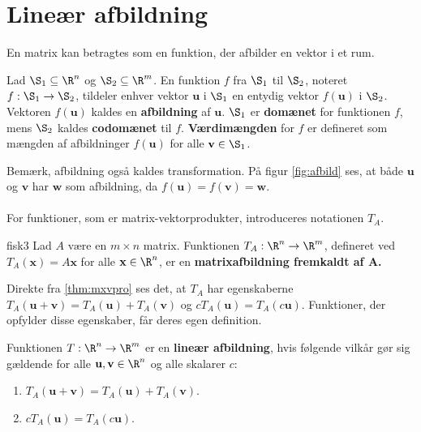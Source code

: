 \section{Lineær afbildning}
%
En matrix kan betragtes som en funktion, der afbilder en vektor i et rum.
%
\begin{defn}{}{}
Lad $\S _1 \subseteq \R^n$ og $\S _2 \subseteq \R^m$.
En funktion $f$ fra $\S_1$ til $\S_2$, noteret $f:\S_1\rightarrow\S_2$, tildeler enhver vektor $\textbf{u}$ i $\S_1$ en entydig vektor $f(\textbf{u})$ i $\S_2$.
Vektoren $f(\textbf{u})$ kaldes en \textbf{afbildning} af $\textbf{u}$.
$\S_1$ er \textbf{domænet} for funktionen $f$, mens $\S_2$ kaldes \textbf{codomænet} til $f$.
\textbf{Værdimængden} for $f$ er defineret som mængden af afbildninger $f(\textbf{u})$ for alle $\textbf{v}\in \S_1$.
\end{defn}\noindent
%
Bemærk, afbildning også kaldes transformation.
På figur \ref{fig:afbild} ses, at både $\textbf{u}$ og $\textbf{v}$ har $\textbf{w}$ som afbildning, da $f(\textbf{u})=f(\textbf{v})=\textbf{w}$. \\\\
%
%

%
For funktioner, som er matrix-vektorprodukter, introduceres notationen $T_A$.
%
\begin{defn}{}{fisk3}
Lad $A$ være en $m \times n$ matrix.
Funktionen $T_A:\R^n \rightarrow \R^m$, defineret ved $T_A(\textbf{x}) = A\textbf{x}$ for alle $\textbf{x} \in \R^n$, er en \textbf{matrixafbildning fremkaldt af $\mathbf{A}$.}
\end{defn}\noindent
%
Direkte fra  \ref{thm:mxvpro} ses det, at $T_A$ har egenskaberne $T_A(\textbf{u}+\textbf{v})=T_A(\textbf{u}) + T_A(\textbf{v})$ og $cT_A(\textbf{u}) = T_A(c\textbf{u})$.
Funktioner, der opfylder disse egenskaber, får deres egen definition.
%
\begin{defn}{}{}
Funktionen $T: \R^n \rightarrow \R^m$ er en \textbf{lineær afbildning}, hvis følgende vilkår gør sig gældende for alle $\textbf{u},\textbf{v} \in \R^n$ og alle skalarer $c$:
\begin{enumerate}[label=(\alph*)]
\item $T_A(\textbf{u}+\textbf{v})=T_A(\textbf{u}) + T_A(\textbf{v})$.
\item $cT_A(\textbf{u}) = T_A(c\textbf{u})$.
\end{enumerate}
\end{defn}\noindent
